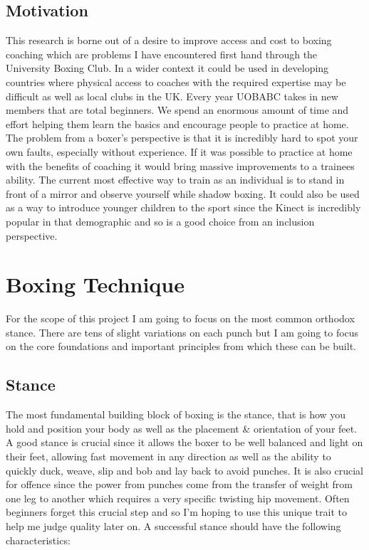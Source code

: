 \subsection{Motivation}
\label{subsec:subsec01}
This research is borne out of a desire to improve access and cost to boxing coaching which are problems I have encountered first hand through the University Boxing Club. In a wider context it could be used in developing countries where physical access to coaches with the required expertise may be difficult as well as local clubs in the UK.
Every year UOBABC takes in new members that are total beginners. We spend an enormous amount of time and effort helping them learn the basics and encourage people to practice at home. The problem from a boxer's perspective is that it is incredibly hard to spot your own faults, especially without experience.
If it was possible to practice at home with the benefits of coaching it would bring massive improvements to a trainees ability. The current most effective way to train as an individual is to stand in front of a mirror and observe yourself while shadow boxing.
It could also be used as a way to introduce younger children to the sport since the Kinect is incredibly popular in that demographic and so 
is a good choice from an inclusion perspective.
\section{Boxing Technique}
\label{sec:sec02}
For the scope of this project I am going to focus on the most common orthodox stance. There are tens of slight variations on each punch but I am going to focus on the core foundations and important principles from which these can be built.
\subsection{Stance}
\label{subsec:subsec02}
The most fundamental building block of boxing is the stance, that is how you hold and position your body as well as the placement \& orientation of your feet. A good stance is crucial since it allows the boxer to be well balanced and light on their feet, allowing fast movement in any direction as well as the ability to quickly duck, weave, slip and bob and lay back to avoid punches. It is also crucial for offence since the power from punches come from the transfer of weight from one leg to another which requires a very specific twisting hip movement. Often beginners forget this crucial step and so I'm hoping to use this unique trait to help me judge quality later on. A successful stance should have the following characteristics:

